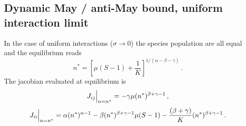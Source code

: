 \documentclass[10pt]{article}
\begin{document}
\subsection{Dynamic May / anti-May bound, uniform interaction limit}
In the case of uniform interactions ($\sigma\to0$)
the species population are all equal and the equilibrium reads
\begin{equation}
    n^*=\left[\mu(S-1)+\frac{1}{K}\right]^{1/(\alpha-\beta-\gamma)} \, .
\end{equation}
The jacobian evaluated at equilibrium is
\begin{equation}
    J_{ij}\Big{|}_{n=n^*} = -\gamma \mu (n^*)^{\beta+\gamma-1} \, ,
\end{equation}
\begin{equation}
    J_{ii}\Big{|}_{n=n^*} = \alpha (n^*)^{\alpha-1}-\beta (n^*)^{\beta+\gamma-1}\mu(S-1)
                            -\frac{(\beta+\gamma)}{K}(n^*)^{\beta+\gamma-1}\, .
\end{equation}
\end{document}

